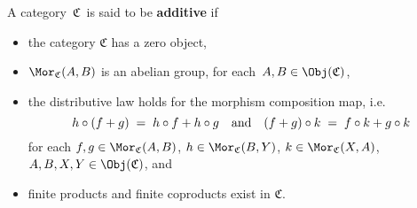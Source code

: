 \vskip 0.5cm
\begin{definition}
\mbox{}
\vskip 0.15cm
\noindent
A category \,$\mathfrak{C}$\, is said to be \textbf{additive} if
\begin{itemize}
\item
	the category $\mathfrak{C}$ has a zero object,
\item
	$\Mor_{\mathfrak{C}}(A,B)$ is an abelian group, for each \,$A, B \in \Obj(\mathfrak{C})$,
\item
	the distributive law holds for the morphism composition map, i.e.
	\begin{equation*}
	h \circ (f + g) \; = \; h \circ f + h \circ g
	\quad\textnormal{and}\quad
	(f + g) \circ k \; = \; f \circ k + g \circ k
	\end{equation*}
	for each
	$f, g \in \Mor_{\mathfrak{C}}(A,B)$,
	$h \in \Mor_{\mathfrak{C}}(B,Y)$,
	$k \in \Mor_{\mathfrak{C}}(X,A)$,
	$A, B, X, Y \in \Obj(\mathfrak{C})$, and
\item
	finite products and finite coproducts exist in $\mathfrak{C}$.
\end{itemize}
\end{definition}

